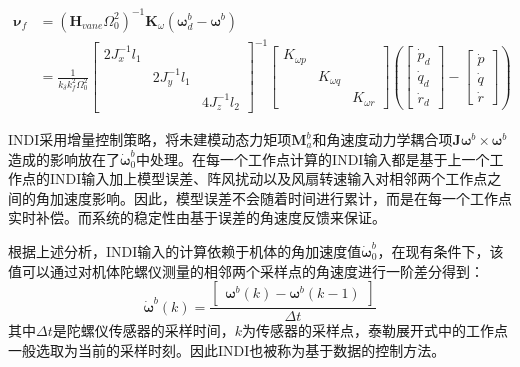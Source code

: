\begin{equation}
    \begin{aligned}
        \boldsymbol{\nu}_f&=(\boldsymbol{H}_{vane}\Omega_0^2)^{-1}\boldsymbol{K}_{\omega}(\boldsymbol{\omega}_d^b-\boldsymbol{\omega}^b)\\
        &=\frac{1}{k_{\delta}k_f^2\Omega_0^2}
        \left[\begin{array}{ccc}2J_x^{-1}l_1 & & \\& 2J_y^{-1}l_1 & \\& & 4J_z^{-1}l_2\end{array}\right]^{-1}
        \left[\begin{array}{ccc}{K}_{\omega p} & & \\& {K}_{\omega q} & \\& & {K}_{\omega r}\end{array}\right]
        \left (\begin{bmatrix}\dot{p}_d \\ \dot{q}_d \\ \dot{r}_d \end{bmatrix}-\begin{bmatrix}\dot{p} \\ \dot{q} \\ \dot{r}
        \end{bmatrix}\right )
    \end{aligned}
    \label{3-48}
\end{equation}

INDI采用增量控制策略，将未建模动态力矩项$\boldsymbol{M}_{a}^b$和角速度动力学耦合项$\boldsymbol{J}\boldsymbol{\omega}^b\times\boldsymbol{\omega}^b$造成的影响放在了$\dot {\boldsymbol{\omega}}_0^b$中处理。在每一个工作点计算的INDI输入都是基于上一个工作点的INDI输入加上模型误差、阵风扰动以及风扇转速输入对相邻两个工作点之间的角加速度影响。因此，模型误差不会随着时间进行累计，而是在每一个工作点实时补偿。而系统的稳定性由基于误差的角速度反馈来保证。

根据上述分析，INDI输入的计算依赖于机体的角加速度值$\dot {\boldsymbol{\omega}}_0^b$，在现有条件下，该值可以通过对机体陀螺仪测量的相邻两个采样点的角速度进行一阶差分得到：
\begin{equation}
    \dot{\boldsymbol{\omega}}^b(k)=\frac{
        \begin{bmatrix}
        \boldsymbol{\omega}^b(k)-\boldsymbol{\omega}^b(k-1)
        \end{bmatrix}}{\Delta t}
    \label{3-49}
\end{equation}
其中$\Delta t$是陀螺仪传感器的采样时间，$k$为传感器的采样点，泰勒展开式中的工作点一般选取为当前的采样时刻。因此INDI也被称为基于数据的控制方法。

